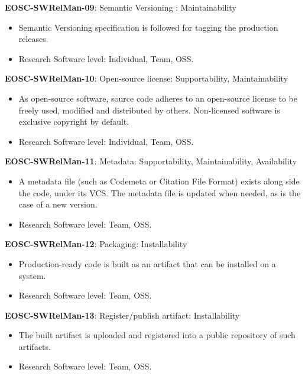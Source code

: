 \textbf{EOSC-SWRelMan-09}: Semantic Versioning : Maintainability

\begin{itemize}
    \item Semantic Versioning specification is followed for tagging the production releases. \cite{orviz_set_2017,raymond_software_2013}
    \item Research Software level: Individual, Team, OSS.
\end{itemize}

\textbf{EOSC-SWRelMan-10}: Open-source license: Supportability, Maintainability

\begin{itemize}
    \item As open-source software, source code adheres to an open-source license to be freely used, modified and distributed by others. Non-licensed software is exclusive copyright by default. \cite{orviz_set_2017,raymond_software_2013}
    \item Research Software level: Individual, Team, OSS.
\end{itemize}

\textbf{EOSC-SWRelMan-11}: Metadata: Supportability, Maintainability, Availability

\begin{itemize}
    \item A metadata file (such as Codemeta or Citation File Format) exists along side the code, under its VCS. The metadata file is updated when needed, as is the case of a new version. \cite{orviz_set_2017}
    \item Research Software level: Team, OSS.
\end{itemize}

\textbf{EOSC-SWRelMan-12}: Packaging: Installability

\begin{itemize}
    \item Production-ready code is  built as an artifact that can be installed on a system. \cite{shepherdson_cessda_2019,orviz_set_2017,raymond_software_2013}
    \item Research Software level: Team, OSS.
\end{itemize}

\textbf{EOSC-SWRelMan-13}: Register/publish artifact: Installability

\begin{itemize}
    \item The built artifact is uploaded and registered into a public repository of such artifacts. \cite{orviz_set_2017}
    \item Research Software level: Team, OSS.
\end{itemize}

